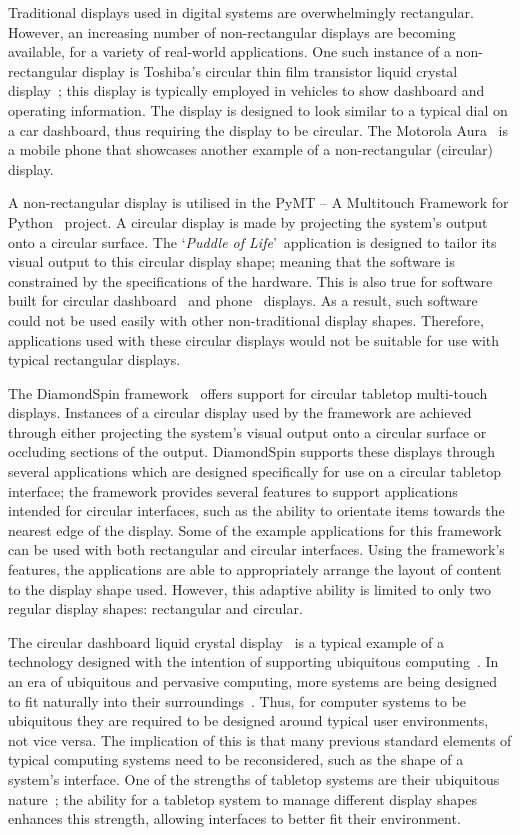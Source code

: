 \documentclass[twocolumn,compsoc]{cvm}
\begin{document}
Traditional displays used in digital systems are overwhelmingly rectangular.
However, an increasing number of non-rectangular displays are becoming available, for a variety of real-world applications.
One such instance of a non-rectangular display is Toshiba's circular
thin film transistor liquid crystal display~\cite{Boyd2007}; this display is typically employed in vehicles to show dashboard and operating information.
The display is designed to look similar to a typical dial on a car dashboard, thus requiring the display to be circular.
The Motorola Aura~\cite{Finney2009} is a mobile phone that showcases another example of a non-rectangular (circular) display.

A non-rectangular display is utilised in the PyMT -- A Multitouch Framework for Python~\cite{Hansen2009} project.
A circular display is made by projecting the system's output onto a circular surface.
The \lq {\emph{Puddle of Life}}\rq\ application is designed to tailor its visual output to this circular display shape; meaning that the software is constrained by the specifications of the hardware.
This is also true for software built for circular dashboard~\cite{Boyd2007} and phone~\cite{Finney2009} displays.
As a result, such software could not be used easily with other non-traditional display shapes.
Therefore, applications used with these circular displays would not be suitable for use with typical rectangular displays.

The DiamondSpin framework~\cite{Shen2004} offers support for circular tabletop multi-touch displays.
Instances of a circular display used by the framework are achieved through either projecting the system's visual output onto a circular surface or occluding sections of the output.
DiamondSpin supports these displays through several applications which are designed specifically for use on a circular tabletop interface; the framework provides several features to support applications intended for circular interfaces, such as the ability to orientate items towards the nearest edge of the display.
Some of the example applications for this framework can be used with both rectangular and circular interfaces.
Using the framework's features, the applications are able to appropriately arrange the layout of content to the display shape used.
However, this adaptive ability is limited to only two regular display shapes: rectangular and circular.

The circular dashboard liquid crystal display~\cite{Boyd2007} is a typical example of a technology designed with the intention of supporting ubiquitous computing~\cite{Weiser1999}.
In an era of ubiquitous and pervasive computing, more systems are being designed to fit naturally into their surroundings~\cite{Greenfield2006}.
Thus, for computer systems to be ubiquitous they are required to be designed around typical user environments, not vice versa.
The implication of this is that many previous standard elements of typical computing systems need to be reconsidered, such as the shape of a system's interface.
One of the strengths of tabletop systems are their ubiquitous nature~\cite{Smith2012}; the ability for a tabletop system to manage different display shapes enhances this strength, allowing interfaces to better fit their environment.
\end{document}
